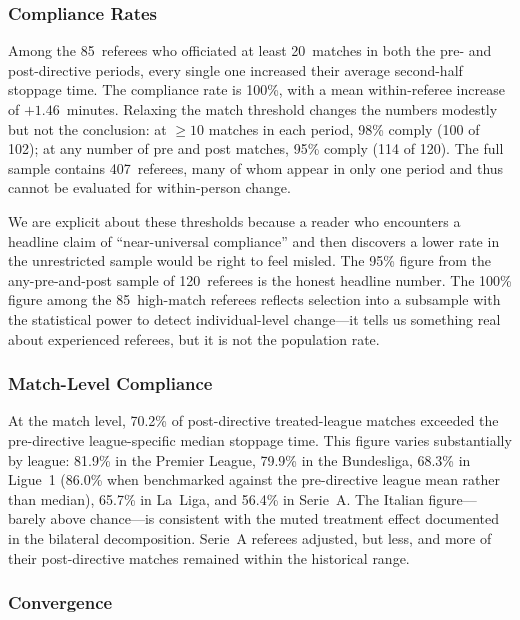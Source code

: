 \subsubsection*{Compliance Rates}

Among the 85~referees who officiated at least 20~matches in both the
pre- and post-directive periods, every single one increased their
average second-half stoppage time. The compliance rate is 100\%, with
a mean within-referee increase of $+1.46$~minutes. Relaxing the match
threshold changes the numbers modestly but not the conclusion: at
$\geq 10$ matches in each period, 98\% comply (100 of 102); at any
number of pre and post matches, 95\% comply (114 of 120). The full
sample contains 407~referees, many of whom appear in only one period
and thus cannot be evaluated for within-person change.

We are explicit about these thresholds because a reader who encounters
a headline claim of ``near-universal compliance'' and then discovers a
lower rate in the unrestricted sample would be right to feel misled.
The 95\% figure from the any-pre-and-post sample of 120~referees is
the honest headline number. The 100\% figure among the 85~high-match
referees reflects selection into a subsample with the statistical power
to detect individual-level change---it tells us something real about
experienced referees, but it is not the population rate.

\subsubsection*{Match-Level Compliance}

At the match level, 70.2\% of post-directive treated-league matches
exceeded the pre-directive league-specific median stoppage time. This
figure varies substantially by league: 81.9\% in the Premier League,
79.9\% in the Bundesliga, 68.3\% in Ligue~1 (86.0\% when benchmarked
against the pre-directive league mean rather than median), 65.7\% in
La~Liga, and 56.4\% in Serie~A. The Italian figure---barely above
chance---is consistent with the muted treatment effect documented in
the bilateral decomposition. Serie~A referees adjusted, but less, and
more of their post-directive matches remained within the historical
range.

\subsubsection*{Convergence}

